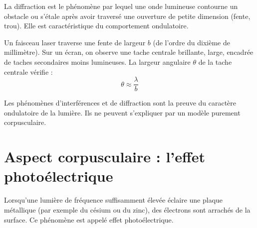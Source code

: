 \begin{definition}[Diffraction]
La diffraction est le phénomène par lequel une onde lumineuse contourne un obstacle ou s'étale après avoir traversé une ouverture de petite dimension (fente, trou). Elle est caractéristique du comportement ondulatoire.
\end{definition}

\begin{experience}
Un faisceau laser traverse une fente de largeur \(b\) (de l'ordre du dixième de millimètre). Sur un écran, on observe une tache centrale brillante, large, encadrée de taches secondaires moins lumineuses. La largeur angulaire \(\theta\) de la tache centrale vérifie :
\[
\theta \approx \frac{\lambda}{b}
\]
\end{experience}

\begin{illus}
\end{illus}

\begin{aretenir}
Les phénomènes d'interférences et de diffraction sont la preuve du caractère ondulatoire de la lumière. Ils ne peuvent s'expliquer par un modèle purement corpusculaire.
\end{aretenir}

\section{Aspect corpusculaire : l'effet photoélectrique}

\begin{experience}
Lorsqu'une lumière de fréquence suffisamment élevée éclaire une plaque métallique (par exemple du césium ou du zinc), des électrons sont arrachés de la surface. Ce phénomène est appelé effet photoélectrique.
\end{experience}


